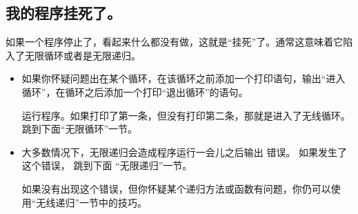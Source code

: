 \subsection{我的程序挂死了。}



如果一个程序停止了，看起来什么都没有做，这就是“挂死”了。通常这意味着它陷入了无限循环或者是无限递归。

\begin{itemize}


\item 如果你怀疑问题出在某个循环，在该循环之前添加一个打印语句，输出“进入循环”，在循环之后添加一个打印“退出循环”的语句。


   运行程序。如果打印了第一条，但没有打印第二条，那就是进入了无线循环。跳到下面“无限循环”一节。


\item 大多数情况下，无限递归会造成程序运行一会儿之后输出 
 错误。  
如果发生了这个错误， 跳到下面 ``无限递归''一节。


如果没有出现这个错误，但你怀疑某个递归方法或函数有问题，你仍可以使用“无线递归”一节中的技巧。



\end{itemize}
